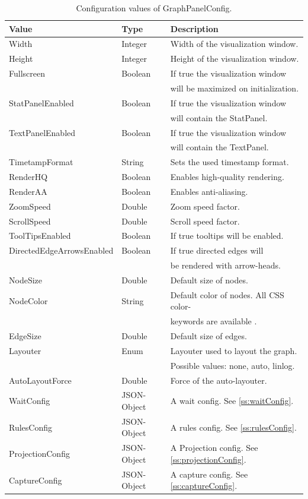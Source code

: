\begin{table}[h]
\centering
\begin{tabular}[h]{|l|l|l|}\hline
	\textbf{Value} & \textbf{Type} & \textbf{Description}\\
	\hline
	Width & Integer & Width of the visualization window.\\
	\hline
	Height & Integer & Height of the visualization window.\\
	\hline
	Fullscreen & Boolean & If true the visualization window\\
	& & will be maximized on initialization.\\
	\hline
	StatPanelEnabled & Boolean & If true the visualization window\\
	& & will contain the StatPanel.\\
	\hline
	TextPanelEnabled & Boolean & If true the visualization window\\
	& & will contain the TextPanel.\\
	\hline
	TimetampFormat & String & Sets the used timestamp format.\\
	\hline
	RenderHQ & Boolean & Enables high-quality rendering.\\
	\hline
	RenderAA & Boolean & Enables anti-aliasing.\\
	\hline
	ZoomSpeed & Double & Zoom speed factor.\\
	\hline
	ScrollSpeed & Double & Scroll speed factor.\\
	\hline	
	ToolTipsEnabled & Boolean & If true tooltips will be enabled.\\
	\hline	
	DirectedEdgeArrowsEnabled & Boolean & If true directed edges will\\
	& & be rendered with arrow-heads.\\
	\hline
	NodeSize & Double & Default size of nodes.\\
	\hline
	NodeColor & String & Default color of nodes. All CSS color-\\
	& & keywords are available \cite{css-colors}.\\
	\hline
	EdgeSize & Double & Default size of edges.\\
	\hline
	Layouter & Enum & Layouter used to layout the graph.\\
	& & Possible values: none, auto, linlog.\\
	\hline
	AutoLayoutForce & Double & Force of the auto-layouter.\\
	\hline
	WaitConfig & JSON-Object & A wait config. See \ref{ss:waitConfig}.\\
	\hline
	RulesConfig & JSON-Object & A rules config. See \ref{ss:rulesConfig}.\\
	\hline
	ProjectionConfig & JSON-Object & A Projection config. See \ref{ss:projectionConfig}.\\
	\hline
	CaptureConfig & JSON-Object & A capture config. See \ref{ss:captureConfig}.\\
	\hline
\end{tabular}
\caption{Configuration values of GraphPanelConfig.}
\label{tab:graphPanelConfigValues}
\end{table}

